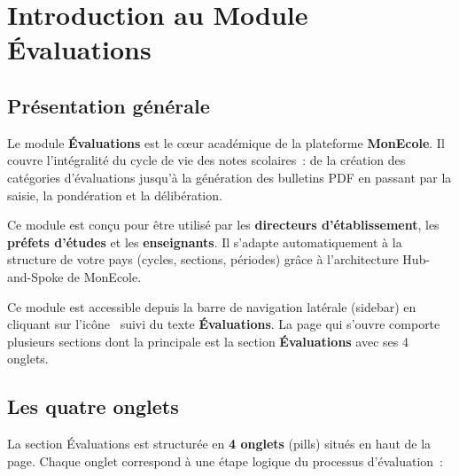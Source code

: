 \documentclass[12pt,a4paper]{report}
\begin{document}
\tableofcontents
\newpage

\chapter{Introduction au Module Évaluations}

\section{Présentation générale}

Le module \textbf{Évaluations} est le cœur académique de la plateforme \textbf{MonEcole}. Il couvre l'intégralité du cycle de vie des notes scolaires~: de la création des catégories d'évaluations jusqu'à la génération des bulletins PDF en passant par la saisie, la pondération et la délibération.

Ce module est conçu pour être utilisé par les \textbf{directeurs d'établissement}, les \textbf{préfets d'études} et les \textbf{enseignants}. Il s'adapte automatiquement à la structure de votre pays (cycles, sections, périodes) grâce à l'architecture Hub-and-Spoke de MonEcole.

\begin{info}
Ce module est accessible depuis la barre de navigation latérale (sidebar) en cliquant sur l'icône \faFile\ suivi du texte \textbf{Évaluations}. La page qui s'ouvre comporte plusieurs sections dont la principale est la section \textbf{Évaluations} avec ses 4 onglets.
\end{info}

\section{Les quatre onglets}

La section Évaluations est structurée en \textbf{4 onglets} (pills) situés en haut de la page. Chaque onglet correspond à une étape logique du processus d'évaluation~:
\end{document}

